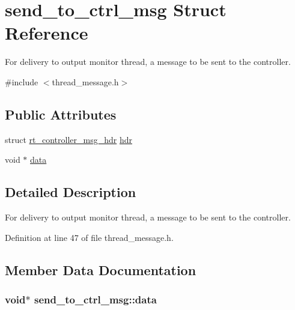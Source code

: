 \hypertarget{structsend__to__ctrl__msg}{\section{send\-\_\-to\-\_\-ctrl\-\_\-msg Struct Reference}
\label{structsend__to__ctrl__msg}
}


For delivery to output monitor thread, a message to be sent to the controller.  




{\ttfamily \#include $<$thread\-\_\-message.\-h$>$}

\subsection*{Public Attributes}
\begin{DoxyCompactItemize}
\item 
struct \hyperlink{structrt__controller__msg__hdr}{rt\-\_\-controller\-\_\-msg\-\_\-hdr} \hyperlink{structsend__to__ctrl__msg_a0081ea72ec0c3835e350ff584a3a4224}{hdr}
\item 
void $\ast$ \hyperlink{structsend__to__ctrl__msg_abbc7f8e78c9e656192e712b5f193d8cd}{data}
\end{DoxyCompactItemize}


\subsection{Detailed Description}
For delivery to output monitor thread, a message to be sent to the controller. 

Definition at line 47 of file thread\-\_\-message.\-h.



\subsection{Member Data Documentation}
\hypertarget{structsend__to__ctrl__msg_abbc7f8e78c9e656192e712b5f193d8cd}{
\subsubsection[{data}]{\setlength{\rightskip}{0pt plus 5cm}void$\ast$ send\-\_\-to\-\_\-ctrl\-\_\-msg\-::data}}\label{structsend__to__ctrl__msg_abbc7f8e78c9e656192e712b5f193d8cd}


